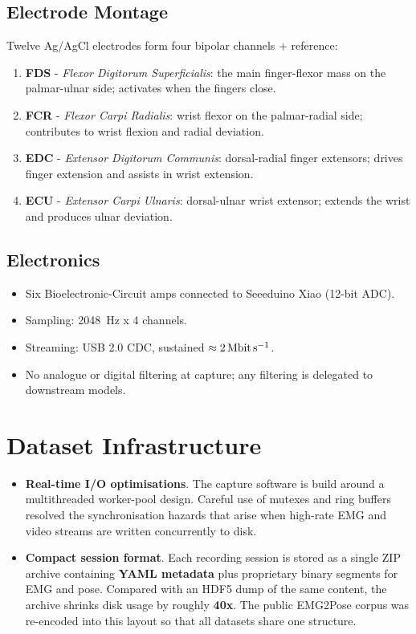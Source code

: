 \subsection{Electrode Montage}
Twelve Ag/AgCl electrodes form four bipolar channels + reference:

\begin{enumerate}[label=\alph*]
  \item \textbf{FDS} - \emph{Flexor Digitorum Superficialis}: the main finger-flexor mass on the palmar-ulnar side; activates when the fingers close.
  \item \textbf{FCR} - \emph{Flexor Carpi Radialis}: wrist flexor on the palmar-radial side; contributes to wrist flexion and radial deviation.
  \item \textbf{EDC} - \emph{Extensor Digitorum Communis}: dorsal-radial finger extensors; drives finger extension and assists in wrist extension.
  \item \textbf{ECU} - \emph{Extensor Carpi Ulnaris}: dorsal-ulnar wrist extensor; extends the wrist and produces ulnar deviation.
\end{enumerate}

\subsection{Electronics}
\begin{itemize}
  \item Six Bioelectronic-Circuit amps connected to Seeeduino Xiao (12-bit ADC).
  \item Sampling: \SI{2048}{Hz} x 4 channels.
  \item Streaming: USB 2.0 CDC, sustained $\approx \SI{2}{\mega\bit\per\second}$.
  \item No analogue or digital filtering at capture; any filtering is delegated
        to downstream models.
\end{itemize}

\section{Dataset Infrastructure}
\begin{itemize}
    \item \textbf{Real-time I/O optimisations}.  
          The capture software is build around a multithreaded
          worker-pool design. Careful use of mutexes and ring buffers resolved
          the synchronisation hazards that arise when high-rate EMG and video
          streams are written concurrently to disk.
    \item \textbf{Compact session format}.  
          Each recording session is stored as a single ZIP archive containing
          \textbf{YAML metadata} plus proprietary binary segments for EMG and
          pose.  Compared with an HDF5 dump of the same content, the archive
          shrinks disk usage by roughly \textbf{40x}. The public EMG2Pose
          corpus was re-encoded into this layout so that all datasets share one
          structure.
\end{itemize}

